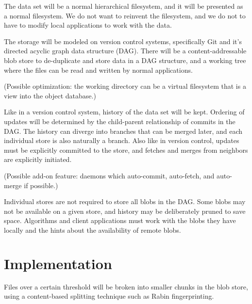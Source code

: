 \documentclass[a4paper]{article}
\begin{document}
The data set will be a normal hierarchical filesystem, and it will be presented
as a normal filesystem. We do not want to reinvent the filesystem, and we do not
to have to modify local applications to work with the data.

The storage will be modeled on version control systems, specifically Git and
it's directed acyclic graph data structure (DAG). There will be a
content-addressable blob store to de-duplicate and store data in a DAG
structure, and a working tree where the files can be read and written by normal
applications.

(Possible optimization: the working directory can be a virtual filesystem that
is a view into the object database.)

Like in a version control system, history of the data set will be kept. Ordering
of updates will be determined by the child-parent relationship of commits in the
DAG. The history can diverge into branches that can be merged later, and each
individual store is also naturally a branch. Also like in version control,
updates must be explicitly committed to the store, and fetches and merges from
neighbors are explicitly initiated.

(Possible add-on feature: daemons which auto-commit, auto-fetch, and auto-merge
if possible.)

Individual stores are not required to store all blobs in the DAG. Some blobs may
not be available on a given store, and history may be deliberately pruned to
save space. Algorithms and client applications must work with the blobs they
have locally and the hints about the availability of remote blobs.


\section{Implementation}\label{implementation}


Files over a certain threshold will be broken into smaller chunks in the blob
store, using a content-based splitting technique such as Rabin fingerprinting.


% 
% 
\end{document}
